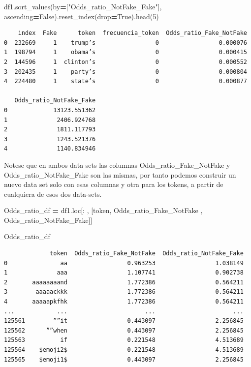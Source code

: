 \documentclass[
  11pt,
  a4paper,
]{article}
\newenvironment{Shaded}{\begin{snugshade}}{\end{snugshade}}
\newcommand{\DecValTok}[1]{\textcolor[rgb]{0.00,0.00,0.81}{#1}}
\newcommand{\NormalTok}[1]{#1}
\newcommand{\OperatorTok}[1]{\textcolor[rgb]{0.81,0.36,0.00}{\textbf{#1}}}
\newcommand{\StringTok}[1]{\textcolor[rgb]{0.31,0.60,0.02}{#1}}
\newcommand{\VariableTok}[1]{\textcolor[rgb]{0.00,0.00,0.00}{#1}}
\begin{document}
\begin{Shaded}
\begin{Highlighting}[]
\NormalTok{df1.sort\_values(by}\OperatorTok{=}\NormalTok{[}\StringTok{"Odds\_ratio\_NotFake\_Fake"}\NormalTok{], ascending}\OperatorTok{=}\VariableTok{False}\NormalTok{).reset\_index(drop}\OperatorTok{=}\VariableTok{True}\NormalTok{).head(}\DecValTok{5}\NormalTok{)}
\end{Highlighting}
\end{Shaded}

\begin{verbatim}
    index  Fake      token  frecuencia_token  Odds_ratio_Fake_NotFake  
0  232669     1    trump’s                 0                 0.000076   
1  198794     1    obama’s                 0                 0.000415   
2  144596     1  clinton’s                 0                 0.000552   
3  202435     1    party’s                 0                 0.000804   
4  224480     1    state’s                 0                 0.000877   

   Odds_ratio_NotFake_Fake  
0             13123.551362  
1              2406.924768  
2              1811.117793  
3              1243.521376  
4              1140.834946 
\end{verbatim}

Notese que en ambos data sets las columnas Odds\_ratio\_Fake\_NotFake y
Odds\_ratio\_NotFake\_Fake son las mismas, por tanto podemos construir
un nuevo data set solo con esas columnas y otra para los tokens, a
partir de cualquiera de esos dos data-sets.

\begin{Shaded}
\begin{Highlighting}[]
\NormalTok{Odds\_ratio\_df }\OperatorTok{=}\NormalTok{ df1.loc[: , [}\StringTok{\textquotesingle{}token\textquotesingle{}}\NormalTok{, }\StringTok{\textquotesingle{}Odds\_ratio\_Fake\_NotFake\textquotesingle{}}\NormalTok{ , }\StringTok{\textquotesingle{}Odds\_ratio\_NotFake\_Fake\textquotesingle{}}\NormalTok{]]  }

\NormalTok{Odds\_ratio\_df}
\end{Highlighting}
\end{Shaded}

\begin{verbatim}
             token  Odds_ratio_Fake_NotFake  Odds_ratio_NotFake_Fake
0               aa                 0.963253                 1.038149
1              aaa                 1.107741                 0.902738
2       aaaaaaaand                 1.772386                 0.564211
3        aaaaackkk                 1.772386                 0.564211
4       aaaaapkfhk                 1.772386                 0.564211
...            ...                      ...                      ...
125561        ””it                 0.443097                 2.256845
125562      ””when                 0.443097                 2.256845
125563          if                 0.221548                 4.513689
125564    $emoji2$                 0.221548                 4.513689
125565    $emoji1$                 0.443097                 2.256845
\end{verbatim}
\end{document}
